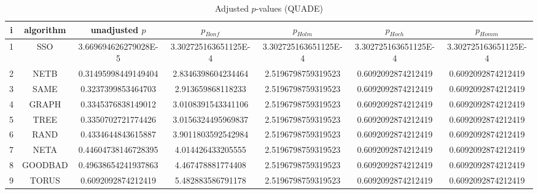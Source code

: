 \documentclass[a4paper,10pt]{article}
\begin{document}
\begin{landscape}
\begin{table}[!htp]
\centering\scriptsize
\caption{Adjusted $p$-values (QUADE)}
\begin{tabular}{ccccccc}
i&algorithm&unadjusted $p$&$p_{Bonf}$&$p_{Holm}$&$p_{Hoch}$&$p_{Homm}$\\
\hline
1& SSO&3.669694626279028E-5&3.302725163651125E-4&3.302725163651125E-4&3.302725163651125E-4&3.302725163651125E-4\\
2& NETB&0.31495998449149404&2.8346398604234464&2.5196798759319523&0.6092092874212419&0.6092092874212419\\
3& SAME&0.3237399853464703&2.913659868118233&2.5196798759319523&0.6092092874212419&0.6092092874212419\\
4& GRAPH&0.3345376838149012&3.0108391543341106&2.5196798759319523&0.6092092874212419&0.6092092874212419\\
5& TREE&0.3350702721774426&3.0156324495969837&2.5196798759319523&0.6092092874212419&0.6092092874212419\\
6& RAND&0.4334644843615887&3.9011803592542984&2.5196798759319523&0.6092092874212419&0.6092092874212419\\
7& NETA&0.44604738146728395&4.014426433205555&2.5196798759319523&0.6092092874212419&0.6092092874212419\\
8& GOODBAD&0.49638654241937863&4.467478881774408&2.5196798759319523&0.6092092874212419&0.6092092874212419\\
9& TORUS&0.6092092874212419&5.482883586791178&2.5196798759319523&0.6092092874212419&0.6092092874212419\\
\hline
\end{tabular}
\end{table}


\end{landscape}
\end{document}
